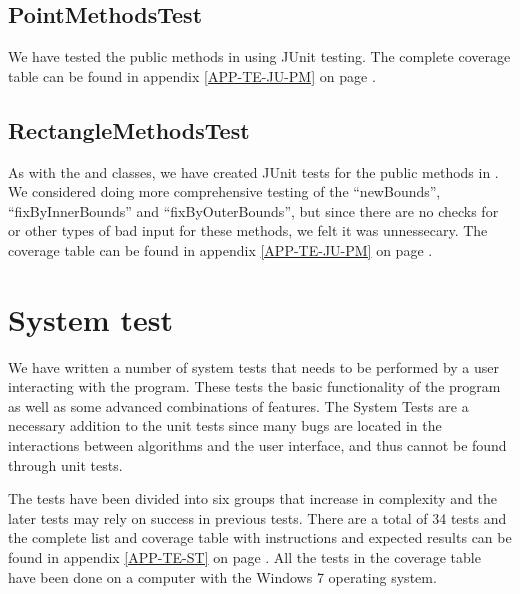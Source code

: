 \subsection{PointMethodsTest}
\label{TEST-JU-PMT}
We have tested the public methods in  using JUnit testing.
The complete coverage table can be found in appendix \ref{APP-TE-JU-PM} on page
\pageref{APP-TE-JU-PM}.

\subsection{RectangleMethodsTest}
\label{TEST-JU-RMT}
As with the  and  classes, we have created
JUnit tests for the public methods in . We considered
doing more comprehensive testing of the ``newBounds'', ``fixByInnerBounds'' and
``fixByOuterBounds'', but since there are no checks for  or other
types of bad input for these methods, we felt it was unnessecary. The coverage
table can be found in appendix \ref{APP-TE-JU-PM} on page
\pageref{APP-TE-JU-PM}.

\section{System test}
\label{TEST-ST}
We have written a number of system tests that needs to be performed by a
user interacting with the program. These tests the basic functionality of the
program as well as some advanced combinations of features. The System Tests are
a necessary addition to the unit tests since many bugs are located in the
interactions between algorithms and the user interface, and thus cannot be found
through unit tests. 

The tests have been divided into six groups that increase in
complexity and the later tests may rely on success in previous tests. There are
a total of 34 tests and the complete list and coverage table with instructions
and expected results can be found in appendix \ref{APP-TE-ST} on page
\pageref{APP-TE-ST}. All the tests in the coverage table have been done on a
computer with the Windows 7 operating system.
